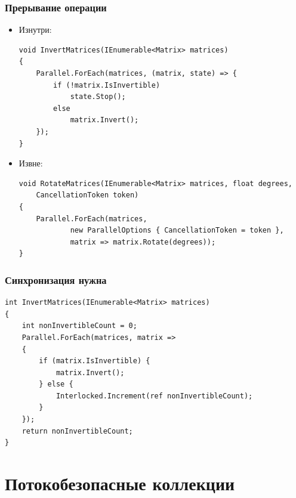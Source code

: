 \documentclass[xetex,mathserif,serif]{beamer}
\begin{document}
    \begin{frame}[fragile]
        \frametitle{Прерывание операции}
        \begin{itemize}
            \item Изнутри:
            \begin{footnotesize}
                \begin{verbatim}
void InvertMatrices(IEnumerable<Matrix> matrices)
{
    Parallel.ForEach(matrices, (matrix, state) => {
        if (!matrix.IsInvertible)
            state.Stop();
        else
            matrix.Invert();
    });
}
                \end{verbatim}
            \end{footnotesize}

            \item Извне:
            \begin{footnotesize}
                \begin{verbatim}
void RotateMatrices(IEnumerable<Matrix> matrices, float degrees,
    CancellationToken token)
{
    Parallel.ForEach(matrices,
            new ParallelOptions { CancellationToken = token },
            matrix => matrix.Rotate(degrees));
}
                \end{verbatim}
            \end{footnotesize}
        \end{itemize}
    \end{frame}

    \begin{frame}[fragile]
        \frametitle{Синхронизация нужна}
        \begin{footnotesize}
            \begin{verbatim}
int InvertMatrices(IEnumerable<Matrix> matrices)
{
    int nonInvertibleCount = 0;
    Parallel.ForEach(matrices, matrix =>
    {
        if (matrix.IsInvertible) {
            matrix.Invert();
        } else {
            Interlocked.Increment(ref nonInvertibleCount);
        }
    });
    return nonInvertibleCount;
}
            \end{verbatim}
        \end{footnotesize}
    \end{frame}

    \section{Потокобезопасные коллекции}
\end{document}
